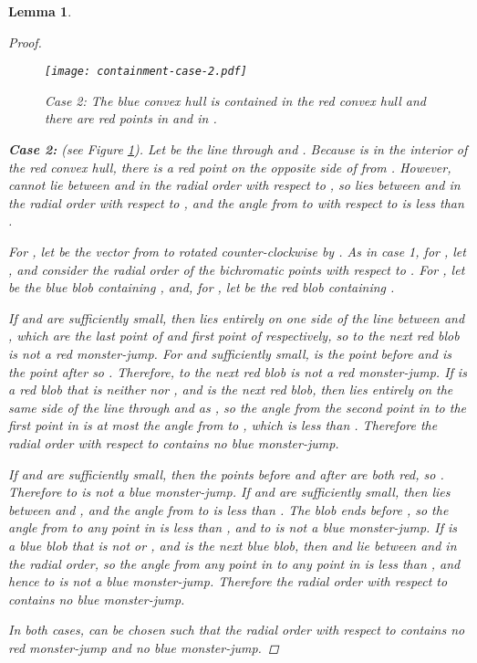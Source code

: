 \documentclass[12pt]{article}
\newtheorem{lemma}{Lemma}
\theoremstyle{definition}
\begin{document}
\begin{lemma}
\begin{proof}
\begin{figure}
\centering
\texttt{[image: containment-case-2.pdf]}
\caption{Case 2: The blue convex hull is contained in the red convex hull and
there are red points  in  and  in .}
\label{fig:containment-case-2}
\end{figure}


    \textbf{Case 2:}  (see Figure \ref{fig:containment-case-2}).
    Let  be the line through  and .
    Because  is in the interior of the red convex hull, there is a red point  on the opposite side of  from .
    However,  cannot lie between  and  in the radial order with respect to , so  lies between  and  in the radial order with respect to , and the angle from  to  with respect to  is less than .
    
    For , let  be the vector from  to  rotated counter-clockwise by .
    As in case 1, for , let , and consider the radial order of the bichromatic points with respect to .
    For , let  be the blue blob containing , and, for , let  be the red blob containing .

    If  and  are sufficiently small, then  lies entirely on one side of the line between  and , which are the last point of  and first point of  respectively, so  to the next red blob is not a red monster-jump.
    For  and  sufficiently small,  is the point before  and  is the point after  so . Therefore,  to the next red blob is not a red monster-jump.
    If  is a red blob that is neither  nor , and  is the next red blob, then  lies entirely on the same side of the line through  and  as , so the angle from the second point in  to the first point in  is at most the angle from  to , which is less than .
    Therefore the radial order with respect to  contains no blue monster-jump.

    If  and  are sufficiently small, then the points before and after  are both red, so .
    Therefore  to  is not a blue monster-jump.
    If  and  are sufficiently small, then  lies between  and , and the angle from  to  is less than .
    The blob  ends before , so the angle from  to any point in  is less than , and  to  is not a blue monster-jump.
    If  is a blue blob that is not  or , and  is the next blue blob, then  and  lie between  and  in the radial order, so the angle from any point in  to any point in  is less than , and hence  to  is not a blue monster-jump.
    Therefore the radial order with respect to  contains no blue monster-jump.

    In both cases,  can be chosen such that the radial order with respect to  contains no red monster-jump and no blue monster-jump.
  \end{proof}
\end{lemma}
\end{document}
